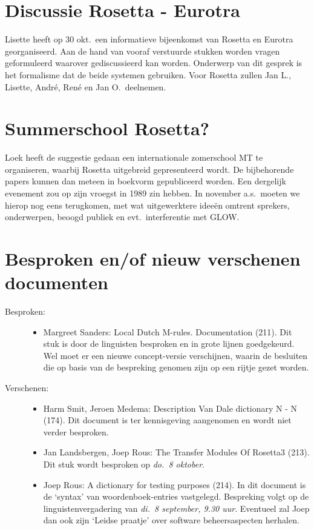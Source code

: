\section{Discussie Rosetta - Eurotra}
Lisette heeft op 30 okt.\ een informatieve bijeenkomst van Rosetta en Eurotra 
georganiseerd. Aan de hand van vooraf verstuurde stukken worden vragen 
geformuleerd waarover gediscussieerd kan worden. Onderwerp van dit gesprek is 
het formalisme dat de beide systemen gebruiken. Voor Rosetta zullen Jan L.,
Lisette, Andr\'{e}, Ren\'{e} en Jan O.\ deelnemen.

\section{Summerschool Rosetta?}
Loek heeft de suggestie gedaan een internationale zomerschool MT te organiseren, 
waarbij Rosetta uitgebreid gepresenteerd wordt. De bijbehorende papers kunnen 
dan meteen in boekvorm gepubliceerd worden. Een dergelijk evenement zou op zijn 
vroegst in 1989 zin hebben. In november a.s.\ moeten we hierop nog eens 
terugkomen, met wat uitgewerktere idee\"{e}n omtrent sprekers, onderwerpen, 
beoogd publiek en evt.\ interferentie met GLOW.

\section{Besproken en/of nieuw verschenen documenten}
\begin{description}
\item [Besproken:]\mbox{}
  \begin{itemize}
  \item Margreet Sanders: Local Dutch M-rules. Documentation (211). Dit stuk is door 
de linguisten besproken en in grote lijnen goedgekeurd. Wel moet er een nieuwe 
concept-versie verschijnen, waarin de besluiten die op basis van de bespreking
genomen zijn op een rijtje gezet worden.
  \end{itemize}
\item [Verschenen:]\mbox{}
  \begin{itemize}
  \item Harm Smit, Jeroen Medema: Description Van Dale dictionary N - N (174). 
Dit document is ter kennisgeving aangenomen en wordt niet verder besproken.
  \item Jan Landsbergen, Joep Rous: The Transfer Modules Of Rosetta3 (213).
Dit stuk wordt besproken op {\em do.\ 8 oktober\/}.
  \item Joep Rous: A dictionary for testing purposes (214). In dit document is 
de `syntax' van woordenboek-entries vastgelegd. Bespreking volgt op de 
linguistenvergadering van {\em di.\ 8 september, 9.30 uur\/}. Eventueel zal 
Joep dan ook zijn `Leidse praatje' over software beheersaspecten herhalen.
  \end{itemize}
\end{description}

